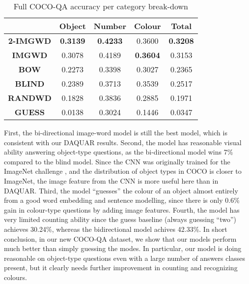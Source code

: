 \begin{table}[h]
\centering
\caption{Full COCO-QA accuracy per category break-down}
\label{tab:cocoqa_acc_breakdown}
\begin{tabular}{c c c c c}
\toprule
                   & \textbf{Object} & \textbf{Number} & \textbf{Colour}  & \textbf{Total}  \\
\midrule
\textbf{2-IMGWD}   & \textbf{0.3139} & \textbf{0.4233} & 0.3600          & \textbf{0.3208} \\
\textbf{IMGWD}     & 0.3078          & 0.4189          & \textbf{0.3604} & 0.3153         \\
\midrule
\textbf{BOW}       & 0.2273          & 0.3398          & 0.3027          & 0.2365          \\
\textbf{BLIND}     & 0.2389          & 0.3713          & 0.3539          & 0.2517          \\
\textbf{RANDWD}    & 0.1828          & 0.3836          & 0.2885          & 0.1971          \\
\textbf{GUESS}     & 0.0138          & 0.3024          & 0.1446          & 0.0347          \\
\bottomrule
\end{tabular}
\end{table}

First, the bi-directional image-word model is still the best model, which is consistent with our DAQUAR results. Second, the model has reasonable visual ability answering object-type questions, as the bi-directional model wins 7\% compared to the blind model. Since the CNN was originally trained for the ImageNet  challenge \cite{ilsvrc14}, and the distribution of object types in COCO is closer to ImageNet, the image feature from the CNN is more useful here than in DAQUAR. Third, the model ``guesses'' the colour of an object almost entirely from a good word embedding and sentence modelling, since there is only 0.6\% gain in colour-type questions by adding image features. Fourth, the model has very limited counting ability since the guess baseline (always guessing ``two'') achieves 30.24\%, whereas the bidirectional model achives 42.33\%. In short conclusion, in our new COCO-QA dataset, we show that our models perform much better than simply guessing the modes. In particular, our model is doing reasonable on object-type questions even with a large number of answers classes present, but it clearly needs further improvement in counting and recognizing colours.

